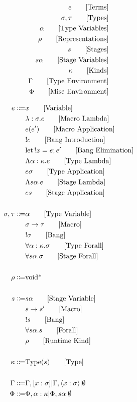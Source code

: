 \documentclass {article}
\begin{document}
\Large

\begin{align*}
e \tag* {[Terms]}\\
\sigma, \tau \tag* {[Types]} \\
\alpha \tag* {[Type Variables]} \\
\rho \tag* {[Representations]} \\
s \tag* {[Stages]} \\
s \alpha \tag* {[Stage Variables]} \\
\kappa \tag* {[Kinds]} \\
\Gamma \tag* {[Type Environment]} \\
\Phi \tag* {[Misc Environment]}
\end{align*}

\begin{align*}
e \Coloneqq & x \tag*{[Variable]}\\
& \lambda : \sigma. e \tag*{[Macro Lambda]}\\
& e(e') \tag*{[Macro Application]}\\
& !e \tag*{[Bang Introduction]} \\
& \text{let} \, !x = e; e' \tag*{[Bang Elimination]} \\ 
& \Lambda \alpha : \kappa. e \tag*{[Type Lambda]} \\
& e \sigma \tag*{[Type Application]} \\
& \Lambda s \alpha. e \tag*{[Stage Lambda]} \\
& e s \tag*{[Stage Application]} \\
\\
\sigma, \tau \Coloneqq & \alpha \tag* {[Type Variable]}\\
& \sigma \to \tau \tag*{[Macro]}\\
& !\sigma \tag*{[Bang]} \\
& \forall \alpha : \kappa. \sigma \tag*{[Type Forall]}\\ 
& \forall s \alpha. \sigma \tag*{[Stage Forall]}\\
\\
\rho \Coloneqq & \text{void*}\\
\\
s \Coloneqq & s \alpha \tag*{[Stage Variable]}\\
& s \to s' \tag*{[Macro]} \\
& !s \tag*{[Bang]} \\
& \forall s \alpha. s \tag*{[Forall]}\\
& \rho \tag*{[Runtime Kind]}\\
\\
\kappa \Coloneqq & \text{Type} (s) \tag*{[Type]}\\
\\
\Gamma \Coloneqq & \Gamma, [x : \sigma] | \Gamma, \langle x : \sigma \rangle | \emptyset \\
\Phi \Coloneqq & \Phi, \alpha : \kappa | \Phi, s \alpha |  \emptyset \\
\end{align*}
\end{document}
